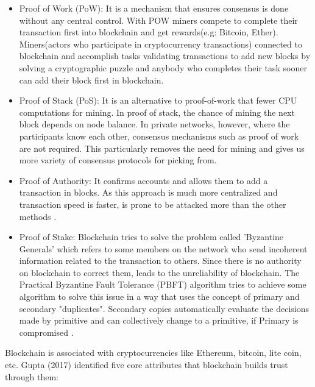 \begin{itemize}
    \item Proof of Work (PoW): 
    It is a mechanism that ensures consensus is done without any central control. With POW miners compete to complete their transaction first into blockchain and get rewards(e.g: Bitcoin, Ether).\\
    Miners(actors who participate in cryptocurrency transactions) connected to blockchain and accomplish tasks validating transactions to add new blocks by solving a cryptographic puzzle and anybody who completes their task sooner can add their block first in blockchain\cite{Pablo}.
    \item Proof of Stack (PoS): 
    It is an alternative to proof-of-work that fewer CPU computations for mining. In proof of stack, the chance of mining the next block depends on node balance. 
    In private networks, however, where the participants know each other, consensus mechanisms such as proof of work are not required. This particularly removes the need for mining and gives us more variety of consensus protocols for picking from\cite{Christidis}.
    \item Proof of Authority: It confirms accounts and allows them to add a transaction in blocks. As this approach is much more centralized and transaction speed is faster, is prone to be attacked more than the other methods \cite{Luke}.
    \item Proof of Stake: Blockchain tries to solve the problem called 'Byzantine Generals' which refers to some members on the network who send incoherent information related to the transaction to others. Since there is no authority on blockchain to correct them, leads to the unreliability of blockchain. The Practical Byzantine Fault Tolerance (PBFT) algorithm tries to achieve some algorithm to solve this issue in a way that uses the concept of primary and secondary "duplicates". Secondary copies automatically evaluate the decisions made by primitive and can collectively change to a primitive, if Primary is compromised \cite{Luke}.
\end{itemize}
Blockchain is associated with cryptocurrencies like Ethereum, bitcoin, lite coin, etc. Gupta (2017) identified five core attributes that blockchain builds trust through them:
